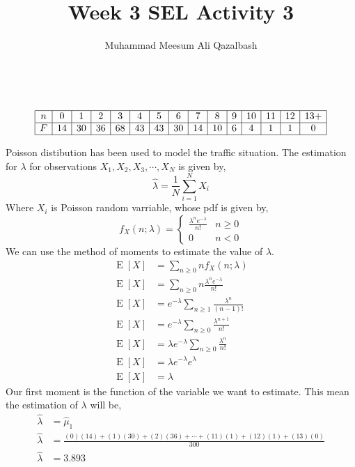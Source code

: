 \documentclass{article}
\title{Week 3 SEL Activity 3}
\author{Muhammad Meesum Ali Qazalbash}
\theoremstyle{mytheoremstyle}
\theoremstyle{mytheoremstyle}
\theoremstyle{myproblemstyle}
\begin{document}
\maketitle\
\begin{equation*}
	\begin{array}{|c|c|c|c|c|c|c|c|c|c|c|c|c|c|c|}
		\hline
		n & 0  & 1  & 2  & 3  & 4  & 5  & 6  & 7  & 8  & 9 & 10 & 11 & 12 & 13+ \\\hline
		F & 14 & 30 & 36 & 68 & 43 & 43 & 30 & 14 & 10 & 6 & 4  & 1  & 1  & 0   \\\hline
	\end{array}
\end{equation*}

Poisson distibution has been used to model the traffic situation. The estimation for \(\lambda\) for observations \(X_1,X_2,X_3,\cdots,X_N\) is given by,
\[\hat{\lambda}=\frac{1}{N}\sum_{i=1}^{N}X_{i}\]
Where \(X_i\) is Poisson random varriable, whose pdf is given by,
\[f_X(n;\lambda)=\begin{cases}
		\displaystyle\frac{\lambda^n e^{-\lambda}}{n!} & n\geq 0 \\
		0                                              & n<0
	\end{cases}\]
We can use the method of moments to estimate the value of \(\lambda\).
\begin{equation*}
	\begin{split}
		\operatorname{E}[X]&=\sum_{n\ge 0}nf_X(n;\lambda)\\
		\operatorname{E}[X]&=\sum_{n\ge 0}n\frac{\lambda^n e^{-\lambda}}{n!}\\
		\operatorname{E}[X]&=e^{-\lambda}\sum_{n\ge 1}\frac{\lambda^n}{(n-1)!}\\
		\operatorname{E}[X]&=e^{-\lambda}\sum_{n\ge 0}\frac{\lambda^{n+1}}{n!}\\
		\operatorname{E}[X]&=\lambda e^{-\lambda}\sum_{n\ge 0}\frac{\lambda^n}{n!}\\
		\operatorname{E}[X]&=\lambda e^{-\lambda}e^{\lambda}\\
		\operatorname{E}[X]&=\lambda
	\end{split}
\end{equation*}
Our first moment is the function of the variable we want to estimate. This mean the estimation of \(\lambda\) will be,
\begin{equation*}
	\begin{split}
		\hat{\lambda}&=\hat{\mu}_1\\
		\hat{\lambda}&=\frac{
			(0)(14)
			+(1)(30)
			+(2)(36)
			+\cdots
			+(11)(1)
			+(12)(1)
			+(13)(0)
		}{300}\\
		\hat{\lambda}&=3.893
	\end{split}
\end{equation*}
\end{document}
